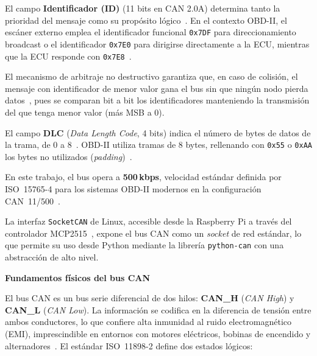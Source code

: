\begin{table}[!htbp]
\caption{Estructura de la trama CAN 2.0A (\textit{Standard Frame Format}) según ISO~11898-1~\cite{ISO11898-1:2024}.}
\label{tab:can_frame}

\end{table}

El campo \textbf{Identificador (ID)} (11 bits en CAN 2.0A) determina tanto la prioridad del mensaje como su propósito lógico~\cite{ISO11898-1:2024}. En el contexto OBD-II, el escáner externo emplea el identificador funcional \texttt{0x7DF} para direccionamiento broadcast o el identificador \texttt{0x7E0} para dirigirse directamente a la ECU, mientras que la ECU responde con \texttt{0x7E8}~\cite{ISO15765-4:2021}.

El mecanismo de arbitraje no destructivo garantiza que, en caso de colisión, el mensaje con identificador de menor valor gana el bus sin que ningún nodo pierda datos~\cite{ISO11898-1:2024}, pues se comparan bit a bit los identificadores manteniendo la transmisión del que tenga menor valor (más MSB a 0).

El campo \textbf{DLC} (\textit{Data Length Code}, 4 bits) indica el número de bytes de datos de la trama, de 0 a 8~\cite{ISO11898-1:2024}. OBD-II utiliza tramas de 8 bytes, rellenando con \texttt{0x55} o \texttt{0xAA} los bytes no utilizados (\textit{padding})~\cite{ISO15765-4:2021}.

En este trabajo, el bus opera a \textbf{500\,kbps}, velocidad estándar definida por ISO~15765-4 para los sistemas OBD-II modernos en la configuración CAN~11/500~\cite{ISO15765-4:2021}.

La interfaz \texttt{SocketCAN} de Linux, accesible desde la Raspberry Pi a través del controlador MCP2515~\cite{Microchip_MCP2515, Waveshare_RS485CANHAT}, expone el bus CAN como un \textit{socket} de red estándar, lo que permite su uso desde Python mediante la librería \texttt{python-can} con una abstracción de alto nivel.


\medskip\noindent\textbf{Fundamentos físicos del bus CAN}

El bus CAN es un bus serie diferencial de dos hilos: \textbf{CAN\_H} (\textit{CAN High}) y \textbf{CAN\_L} (\textit{CAN Low}). La información se codifica en la diferencia de tensión entre ambos conductores, lo que confiere alta inmunidad al ruido electromagnético (EMI), imprescindible en entornos con motores eléctricos, bobinas de encendido y alternadores~\cite{ISO11898-2:2024}. El estándar ISO~11898-2 define dos estados lógicos:

